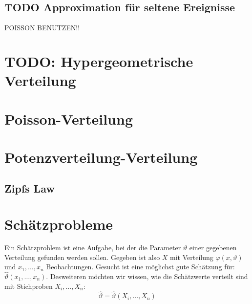\documentclass[../Main.tex]{subfiles}
\begin{document}
\subsection{TODO Approximation für seltene Ereignisse}
POISSON BENUTZEN!!

\section{TODO: Hypergeometrische Verteilung}

\section{Poisson-Verteilung}
\section{Potenzverteilung-Verteilung}
\subsection{Zipfs Law}

\section{Schätzprobleme}
Ein Schätzproblem ist eine Aufgabe, bei der die Parameter \(\vartheta\) einer gegebenen
Verteilung gefunden werden sollen. Gegeben ist also \(X\) mit Verteilung
\(\varphi(x,\vartheta)\) und \(x_1,\dots,x_n\) Beobachtungen.
Gesucht ist eine möglichst gute Schätzung für: \(\hat{\vartheta}(x_1,\dots,x_n)\).
Desweiteren möchten wir wissen, wie die Schätzwerte verteilt sind mit
Stichproben \(X_i,\dots,X_n\):
\begin{equation}
    \hat{\vartheta} = \hat{\vartheta}(X_i,\dots,X_n)
\end{equation}



\end{document}
